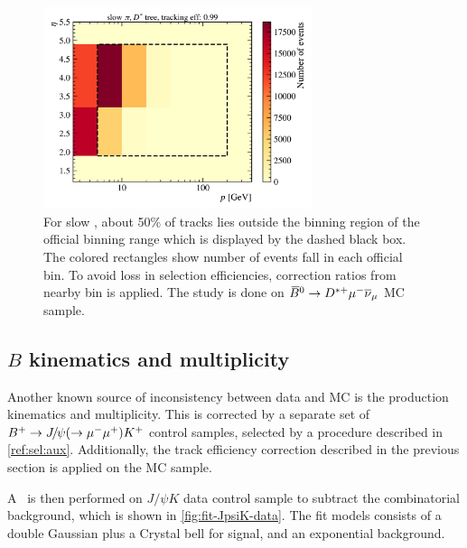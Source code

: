 \begin{figure}[htb]
    \centering
    \includegraphics[width=0.7\textwidth]{./figs-mc-correction/reweighting-tracking/Dst_spi_p_eta.pdf}
    \caption{
        For slow \pion, about 50\% of tracks lies outside the binning region
        of the official \trackcalib binning range which is displayed by the
        dashed black box.
        The colored rectangles show number of events fall in each
        official \trackcalib bin.
        To avoid loss in selection efficiencies,
        correction ratios from nearby bin is applied.
        The study is done on ${{\kern 0.18em\overline{\kern -0.18em B}}{}^0} \rightarrow {\ensuremath{{D}^{*+}}} {\ensuremath{\mu^-}} {\ensuremath{{\overline{\nu}}_\mu}}$ MC sample.
    }
    \label{fig:trackcalib-slow-pi}
\end{figure}


\subsection{$B$ kinematics and multiplicity}
\label{ref:mc-cor:init:jpsi-k}

Another known source of inconsistency between data and MC is the \B production
kinematics and multiplicity.
This is corrected by a separate set of
${{{B}^+}} \rightarrow {\ensuremath{{J\mskip -3mu/\mskip -2mu\psi}}} (\rightarrow {\ensuremath{\mu^-}}{\ensuremath{\mu^+}}) {{K}^+}$
control samples, selected by a procedure described
in \cref{ref:sel:aux}.
Additionally, the track efficiency correction described in the previous section
is applied on the \jpsi\kaon MC sample.

A \sPlot\ is then performed on $J/\psi K$ data control sample to subtract
the combinatorial background, which is shown in \cref{fig:fit-JpsiK-data}.
The fit models consists of a double Gaussian plus a Crystal bell for signal,
and an exponential background.

